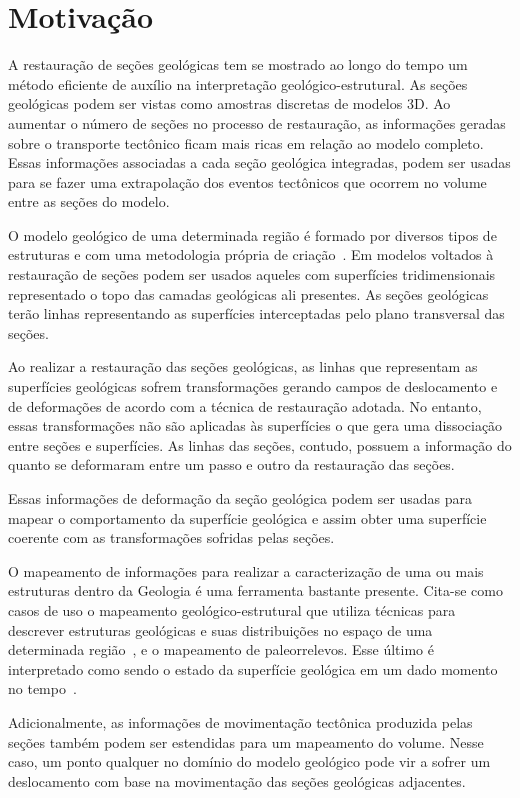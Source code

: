 \section{Motivação}

A restauração de seções geológicas tem se mostrado ao longo do tempo um método eficiente de auxílio na interpretação geológico-estrutural. As seções geológicas podem ser vistas como amostras discretas de modelos 3D. Ao aumentar o número de seções no processo de restauração, as informações geradas sobre o transporte tectônico ficam mais ricas em relação ao modelo completo. Essas informações associadas a cada seção geológica integradas, podem ser usadas para se fazer uma extrapolação dos eventos tectônicos que ocorrem no volume entre as seções do modelo.

O modelo geológico de uma determinada região é formado por diversos tipos de estruturas e com uma metodologia própria de criação~\cite{Rodrigues}. Em modelos voltados à restauração de seções podem ser usados aqueles com superfícies tridimensionais representado o topo das camadas geológicas ali presentes. As seções geológicas terão linhas representando as superfícies interceptadas pelo plano transversal das seções.

Ao realizar a restauração das seções geológicas, as linhas que representam as superfícies geológicas sofrem transformações gerando campos de deslocamento e de deformações de acordo com a técnica de restauração adotada. No entanto, essas transformações não são aplicadas às superfícies o que gera uma dissociação entre seções e superfícies. As linhas das seções, contudo, possuem a informação do quanto se deformaram entre um passo e outro da restauração das seções.

Essas informações de deformação da seção geológica podem ser usadas para mapear o comportamento da superfície geológica e assim obter uma superfície coerente com as transformações sofridas pelas seções.

O mapeamento de informações para realizar a caracterização de uma ou mais estruturas dentro da Geologia é uma ferramenta bastante presente. Cita-se como casos de uso o mapeamento geológico-estrutural que utiliza técnicas para descrever estruturas geológicas e suas distribuições no espaço de uma determinada região~\cite{Borges, Felipe}, e o mapeamento de paleorrelevos. Esse último é interpretado como sendo o estado da superfície geológica em um dado momento no tempo~\cite{Archela}.

Adicionalmente, as informações de movimentação tectônica produzida pelas seções também podem ser estendidas para um mapeamento do volume. Nesse caso, um ponto qualquer no domínio do modelo geológico pode vir a sofrer um deslocamento com base na movimentação das seções geológicas adjacentes.

